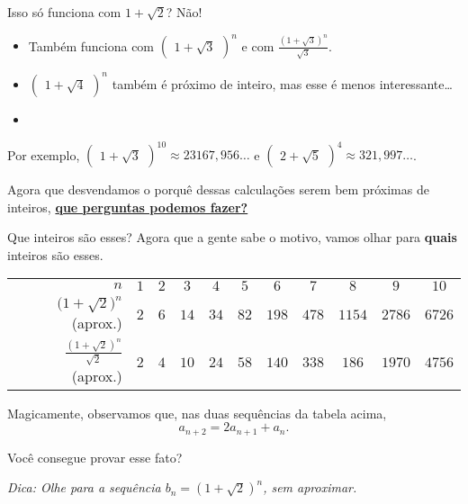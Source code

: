 \documentclass[aspectratio=169, handout]{beamer}
\begin{document}
\begin{frame}{Isso só funciona com $1+\sqrt{2}$?}
	\pause Não!

	\pause	
	
	\begin{itemize}
		\item Também funciona com $\begin{pmatrix}1+\sqrt{3}\end{pmatrix}^n$ \pause e com $\frac{\left(1+\sqrt{3}\right)^n}{\sqrt{3}}$.

		\pause \item  $\begin{pmatrix}1+\sqrt{4}\end{pmatrix}^n$ também é próximo de inteiro, mas esse é menos interessante\dots

		\pause \item {}\pause
	\end{itemize}

	\pause Por exemplo, $\begin{pmatrix}1+\sqrt{3}\end{pmatrix}^{10} \approx 23167{,}956\dots$ e  $\begin{pmatrix}2+\sqrt{5}\end{pmatrix}^4 \approx 321{,}997\dots$.

	\vspace{3em}
	\pause Agora que desvendamos o porquê dessas calculações serem bem próximas de inteiros, \underline{\textbf{que perguntas podemos fazer?}}

\end{frame}

\begin{frame}{Que inteiros são esses?}	
	Agora que a gente sabe o motivo, vamos olhar para \textbf{quais} inteiros são esses. \pause

	\begin{table}\renewcommand{\arraystretch}{2}
		\begin{tabular}{r|cccccccccc}
			$n$ & $1$ & $2$ & $3$ & $4$ & $5$ & $6$ & $7$ & $8$ & $9$ & $10$ \\
			$\big(1+\sqrt{2}\big)^n$ (aprox.) & $2$ & $6$ & $14$ &  $34$ & $82$ & $198$ &  $478$ & $1154$ & $2786$ &  $6726$ \\
			$\frac{\left(1+\sqrt{2}\right)^n}{\sqrt{2}}$ (aprox.) & $2$ & $4$ & $10$ &  $24$ & $58$ & $140$ &  $338$ & $186$ & $1970$ &  $4756$ \\
		\end{tabular}
	\end{table}

	\pause Magicamente, observamos que, nas duas sequências da tabela acima, \[
		a_{n+2} = 2a_{n+1} + a_{n}.
	\]

	Você consegue provar esse fato?

	\pause \emph{\footnotesize Dica: Olhe para a sequência $b_n = (1+\sqrt{2})^n$, sem aproximar.}
\end{frame}
\end{document}
